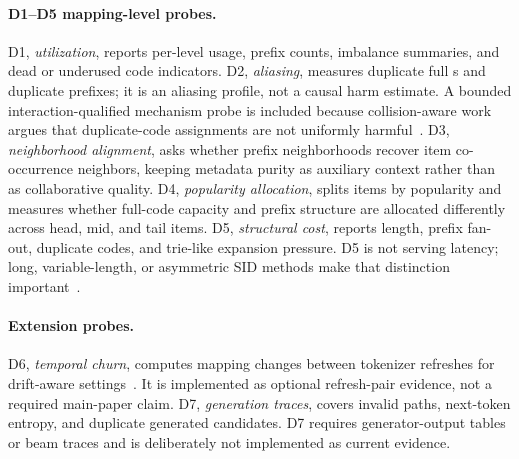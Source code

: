\paragraph{D1--D5 mapping-level probes.}
D1, \emph{utilization}, reports per-level usage, prefix counts, imbalance
summaries, and dead or underused code indicators. D2, \emph{aliasing},
measures duplicate full \sid{}s and duplicate prefixes; it is an aliasing
profile, not a causal harm estimate. A bounded interaction-qualified mechanism
probe is included because collision-aware work argues that duplicate-code
assignments are not uniformly harmful~\cite{hu2026quasid}. D3, \emph{neighborhood alignment}, asks
whether prefix neighborhoods recover item co-occurrence neighbors, keeping
metadata purity as auxiliary context rather than as collaborative quality. D4,
\emph{popularity allocation}, splits items by popularity and measures whether
full-code capacity and prefix structure are allocated differently across head,
mid, and tail items. D5, \emph{structural cost}, reports \sid length, prefix
fan-out, duplicate codes, and trie-like expansion pressure. D5 is not serving
latency; long, variable-length, or asymmetric SID methods make that distinction
important~\cite{xia2026acerec,cheng2026capsid,huang2026asymrec,zhang2026hgrec,wang2026varlenrec}.

\paragraph{Extension probes.}
D6, \emph{temporal churn}, computes mapping changes between tokenizer
refreshes for drift-aware settings~\cite{feng2026dact,baikalov2026staleness}.
It is implemented as optional refresh-pair evidence, not a required main-paper
claim.
D7, \emph{generation traces}, covers invalid paths, next-token entropy, and
duplicate generated candidates. D7 requires generator-output tables or beam
traces and is deliberately not implemented as current evidence.

